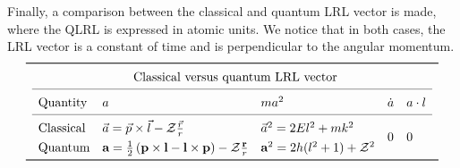 \documentclass[12pt,a4paper]{report}
\theoremstyle{definition}
\theoremstyle{remark}
\theoremstyle{remark}
\begin{document}
Finally, a comparison between the classical and quantum LRL vector is made, where the QLRL is expressed in atomic units. We notice that in both cases, the LRL vector is a constant of time and is perpendicular to the angular momentum.
\begin{equation*}
\def\arraystretch{1.3}
\begin{array}{@{}lllllll@{}}
\toprule
\multicolumn{7}{c@{}}{\text{Classical versus quantum LRL vector}}\\
\cmidrule{2-6}
&\text{Quantity} & a & ma^2 & \dot{a} & a\cdot l& \\
\cmidrule{2-6}
&\text{Classical} & \vec{a}=\vec{p}\times\vec{l}-\mathcal{Z}\frac{\vec{r}}{r} & \vec{a}^2=2El^2+mk^2 & \multirow{2}{*}{0} & \multirow{2}{*}{0}& \\ 
&\text{Quantum} & \textbf{a}=\frac{1}{2}\left(\textbf{p}\times\textbf{l}-\textbf{l}\times\textbf{p}\right)-\mathcal{Z}\frac{\textbf{r}}{r} & \textbf{a}^2=2h(l^2+1)+\mathcal{Z}^2 & & & \\
\bottomrule
\end{array}
\end{equation*}
\end{document}
